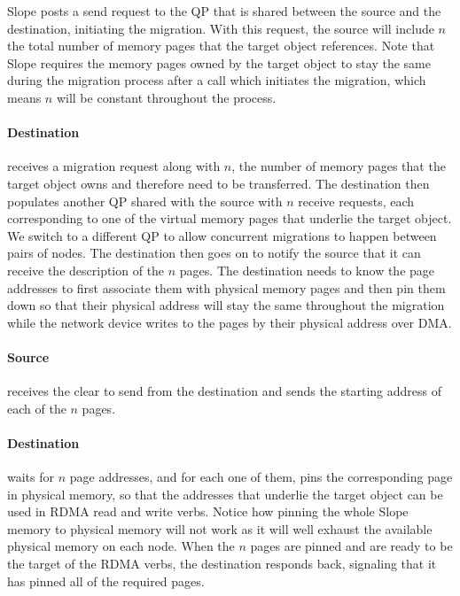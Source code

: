 Slope posts a send request to the QP that is shared
between the source and the destination, initiating the migration.
With this request, the source will include $n$ the total number of
memory pages that the target object references. Note that Slope requires the
memory pages owned by the target object to stay the same during the migration
process after a call which initiates the migration, which means $n$ will be
constant throughout the process.

\paragraph{Destination}
receives a migration request along with $n$, the number of memory pages that the
target object owns and therefore need to
be transferred. The destination then populates another QP shared with the source
with $n$ receive requests, each corresponding to one of the virtual memory pages
that underlie the target object. We switch to a different QP
to allow concurrent migrations to happen between pairs of nodes. The destination
then goes on to notify the source that it can receive the description of the $n$
pages. The destination needs to know the page addresses
to first associate them with physical memory pages and then pin them down so that their
physical address will stay the same throughout the migration while the network
device writes to the pages by their physical address over DMA.

\paragraph{Source} receives the clear to send from the destination and sends the starting address
of each of the $n$ pages.

\paragraph{Destination} waits for $n$ page addresses, and for each one of them, pins the
corresponding page in physical memory, so that the addresses that underlie the
target object can be used in RDMA read and write verbs. Notice how pinning the
whole Slope memory to physical memory will not work as it will well exhaust the
available physical memory on each node. When the $n$ pages are pinned
and are ready to be the target of the RDMA verbs, the destination responds back,
signaling that it has pinned all of the required pages.

